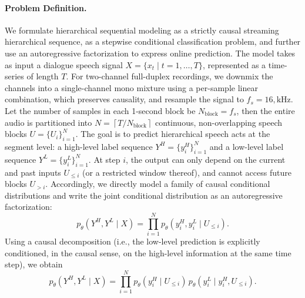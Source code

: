 \paragraph{Problem Definition.}
We formulate hierarchical sequential modeling as a strictly causal streaming hierarchical sequence, as a stepwise conditional classification problem, and further use an autoregressive factorization to express online prediction. The model takes as input a dialogue speech signal $X=\{x_t \mid t=1,\ldots,T\}$, represented as a time-series of length $T$.
For two-channel full-duplex recordings, we downmix the channels into a single-channel mono mixture using a per-sample linear combination, which preserves causality, and resample the signal to $f_s=16,\text{kHz}$.
 Let the number of samples in each 1-second block be
$N_{\text{block}} = f_s$, then the entire audio is partitioned into $N=\left\lceil T/N_{\text{block}} \right\rceil$ continuous, non-overlapping speech blocks $U=\{U_i\}_{i=1}^{N}$. The goal is to predict hierarchical speech acts at the segment level: a high-level label sequence
$Y^{H}=\{y_i^{H}\}_{i=1}^{N}$ and a low-level label sequence $Y^{L}=\{y_i^{L}\}_{i=1}^{N}$.
At step $i$, the output can only depend on the current and past inputs $U_{\le i}$ (or a restricted window thereof), and cannot access future blocks $U_{>i}$. Accordingly, we directly model a family of causal conditional distributions and write the joint conditional distribution as an autoregressive factorization:
\begin{equation}
p_\theta(Y^{H},Y^{L}\mid X)
=
\prod_{i=1}^{N}
p_\theta\!\left(y_i^{H},y_i^{L}\mid U_{\le i}\right).
\end{equation}
Using a causal decomposition (i.e., the low-level prediction is explicitly conditioned, in the causal sense, on the high-level information at the same time step), we obtain
\begin{equation}
p_\theta(Y^{H},Y^{L}\mid X)
=
\prod_{i=1}^{N}
p_\theta\!\left(y_i^{H}\mid U_{\le i}\right)\,
p_\theta\!\left(y_i^{L}\mid y_i^{H},U_{\le i}\right).
\end{equation}
